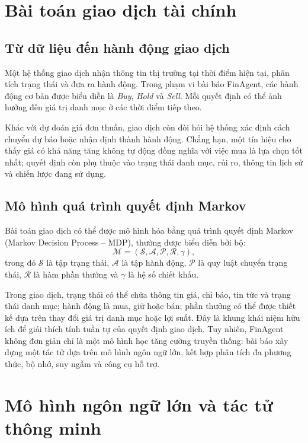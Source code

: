 \section{Bài toán giao dịch tài chính}

\subsection{Từ dữ liệu đến hành động giao dịch}
Một hệ thống giao dịch nhận thông tin thị trường tại thời điểm hiện tại, phân tích trạng thái và đưa ra hành động. Trong phạm vi bài báo FinAgent, các hành động cơ bản được biểu diễn là \textit{Buy}, \textit{Hold} và \textit{Sell}. Mỗi quyết định có thể ảnh hưởng đến giá trị danh mục ở các thời điểm tiếp theo.

Khác với dự đoán giá đơn thuần, giao dịch còn đòi hỏi hệ thống xác định cách chuyển dự báo hoặc nhận định thành hành động. Chẳng hạn, một tín hiệu cho thấy giá có khả năng tăng không tự động đồng nghĩa với việc mua là lựa chọn tốt nhất; quyết định còn phụ thuộc vào trạng thái danh mục, rủi ro, thông tin lịch sử và chiến lược đang sử dụng.

\subsection{Mô hình quá trình quyết định Markov}
Bài toán giao dịch có thể được mô hình hóa bằng quá trình quyết định Markov (Markov Decision Process -- MDP), thường được biểu diễn bởi bộ:
\[
\mathcal{M}=(\mathcal{S},\mathcal{A},\mathcal{P},\mathcal{R},\gamma),
\]
trong đó $\mathcal{S}$ là tập trạng thái, $\mathcal{A}$ là tập hành động, $\mathcal{P}$ là quy luật chuyển trạng thái, $\mathcal{R}$ là hàm phần thưởng và $\gamma$ là hệ số chiết khấu.

Trong giao dịch, trạng thái có thể chứa thông tin giá, chỉ báo, tin tức và trạng thái danh mục; hành động là mua, giữ hoặc bán; phần thưởng có thể được thiết kế dựa trên thay đổi giá trị danh mục hoặc lợi suất. Đây là khung khái niệm hữu ích để giải thích tính tuần tự của quyết định giao dịch. Tuy nhiên, FinAgent không đơn giản chỉ là một mô hình học tăng cường truyền thống: bài báo xây dựng một tác tử dựa trên mô hình ngôn ngữ lớn, kết hợp phân tích đa phương thức, bộ nhớ, suy ngẫm và công cụ hỗ trợ.

\section{Mô hình ngôn ngữ lớn và tác tử thông minh}

